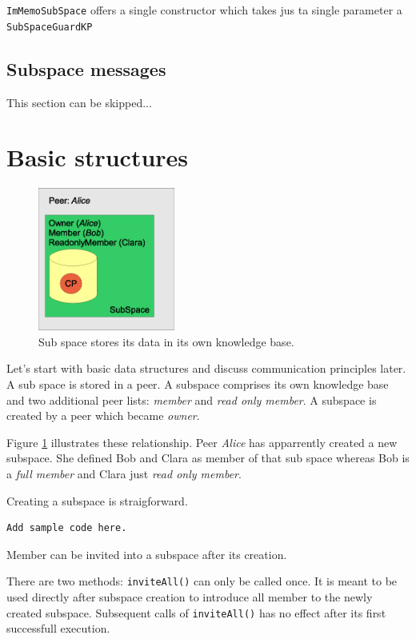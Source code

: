 {\tt ImMemoSubSpace} offers a single constructor which takes jus ta single parameter a {\tt SubSpaceGuardKP}

\subsection{Subspace messages}
\label{subspacemessages}
This section can be skipped...


\section{Basic structures}
\begin{figure}[t]
\centering
\includegraphics[width=0.40\textwidth]{subspace.eps}
\caption{Sub space stores its data in its own knowledge base.}
\label{fig:subspace}
\end{figure}

Let's start with basic data structures and discuss communication principles later. A sub space is stored in a peer. A subspace comprises its own knowledge base and two additional peer lists: {\it member} and {\it read only member}.
A subspace is created by a peer which became {\it owner}.

Figure \ref{fig:subspace} illustrates these relationship. Peer {\it Alice} has apparrently created a new subspace. She defined Bob and Clara as member of that sub space whereas Bob is a {\it full member} and Clara just {\it read only member}.

Creating a subspace is straigforward.
\begin{verbatim}
Add sample code here.
\end{verbatim}

Member can be invited into a subspace after its creation.

There are two methods: {\verb|inviteAll()|} can only be called once. It is meant to be used directly after subspace creation to introduce all member to the newly created subspace. Subsequent calls of {\verb|inviteAll()|} has no effect after its first successfull execution.


